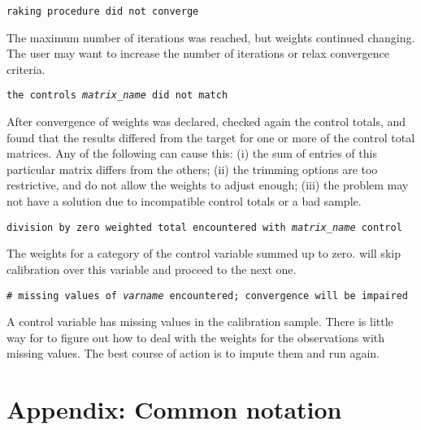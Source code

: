     \noindent
    {\tt raking procedure did not converge}

    \morehang
    The maximum number of iterations was reached, but weights continued
    changing. The user may want to increase the number of iterations
    or relax convergence criteria.

    \noindent
    {\tt the controls {\it matrix{\_}name} did not match}

    \morehang
    After convergence of weights was declared, 
    checked again the control totals, and found that the results
    differed from the target for one or more of the control total
    matrices. Any of the following can cause this: (i) the sum of
    entries of this particular matrix differs from the others;
    (ii) the trimming options are too restrictive, and do not allow
    the weights to adjust enough; (iii) the problem may not have a
    solution due to incompatible control totals or a bad sample.

    \noindent
    {\tt division by zero weighted total encountered with
    {\it matrix{\_}name} control}

    \morehang
    The weights for a category of the control variable summed up
    to zero.  will skip calibration over this
    variable and proceed to the next one.

    \noindent
    {\tt \# missing values of {\it varname} encountered; convergence will be impaired}

    \morehang
    A control variable has missing values in the calibration sample.
    There is little way for  to figure out how to deal
    with the weights for the observations with missing values. The best course
    of action is to impute them and run  again.





% 


\appendix

\section*{Appendix: Common notation}


